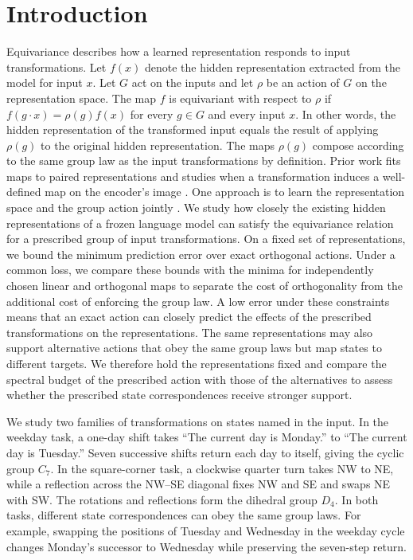 \section{Introduction}
Equivariance describes how a learned representation responds to input transformations.
Let $f(x)$ denote the hidden representation extracted from the model for input $x$.
Let $G$ act on the inputs and let $\rho$ be an action of $G$ on the representation space.
The map $f$ is equivariant with respect to $\rho$ if $f(g\cdot x)=\rho(g)f(x)$ for every $g\in G$ and every input $x$.
In other words, the hidden representation of the transformed input equals the result of applying $\rho(g)$ to the original hidden representation.
The maps $\rho(g)$ compose according to the same group law as the input transformations by definition.
Prior work fits maps to paired representations \citep{lenc2015understanding} and studies when a transformation induces a well-defined map on the encoder's image \citep{sun2026transformationlaws}.
One approach is to learn the representation space and the group action jointly \citep{schmidt2025equivariance}.
We study how closely the existing hidden representations of a frozen language model can satisfy the equivariance relation for a prescribed group of input transformations.
On a fixed set of representations, we bound the minimum prediction error over exact orthogonal actions.
Under a common loss, we compare these bounds with the minima for independently chosen linear and orthogonal maps to separate the cost of orthogonality from the additional cost of enforcing the group law.
A low error under these constraints means that an exact action can closely predict the effects of the prescribed transformations on the representations.
The same representations may also support alternative actions that obey the same group laws but map states to different targets.
We therefore hold the representations fixed and compare the spectral budget of the prescribed action with those of the alternatives to assess whether the prescribed state correspondences receive stronger support.

We study two families of transformations on states named in the input.
In the weekday task, a one-day shift takes ``The current day is Monday.'' to ``The current day is Tuesday.''
Seven successive shifts return each day to itself, giving the cyclic group $C_7$.
In the square-corner task, a clockwise quarter turn takes NW to NE, while a reflection across the NW--SE diagonal fixes NW and SE and swaps NE with SW.
The rotations and reflections form the dihedral group $D_4$.
In both tasks, different state correspondences can obey the same group laws.
For example, swapping the positions of Tuesday and Wednesday in the weekday cycle changes Monday's successor to Wednesday while preserving the seven-step return.

